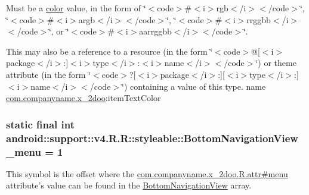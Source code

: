 Must be a \hyperlink{classandroid_1_1support_1_1v4_1_1_r_1_1color}{color} value, in the form of \char`\"{}$<$code$>$\#$<$i$>$rgb$<$/i$>$$<$/code$>$\char`\"{}, \char`\"{}$<$code$>$\#$<$i$>$argb$<$/i$>$$<$/code$>$\char`\"{}, \char`\"{}$<$code$>$\#$<$i$>$rrggbb$<$/i$>$$<$/code$>$\char`\"{}, or \char`\"{}$<$code$>$\#$<$i$>$aarrggbb$<$/i$>$$<$/code$>$\char`\"{}. 

This may also be a reference to a resource (in the form \char`\"{}$<$code$>$@\mbox{[}$<$i$>$package$<$/i$>$:\mbox{]}$<$i$>$type$<$/i$>$:$<$i$>$name$<$/i$>$$<$/code$>$\char`\"{}) or theme attribute (in the form \char`\"{}$<$code$>$?\mbox{[}$<$i$>$package$<$/i$>$:\mbox{]}\mbox{[}$<$i$>$type$<$/i$>$:\mbox{]}$<$i$>$name$<$/i$>$$<$/code$>$\char`\"{}) containing a value of this type.  name \hyperlink{namespacecom_1_1companyname_1_1x__2doo}{com.companyname.x\_\-2doo}:itemTextColor \hypertarget{classandroid_1_1support_1_1v4_1_1_r_1_1styleable_b466b14ca9f60097882bb309cd4e7d6f}{
\subsubsection[{BottomNavigationView\_\-menu}]{\setlength{\rightskip}{0pt plus 5cm}static final int android::support::v4.R.R::styleable::BottomNavigationView\_\-menu = 1}}
\label{classandroid_1_1support_1_1v4_1_1_r_1_1styleable_b466b14ca9f60097882bb309cd4e7d6f}


This symbol is the offset where the \hyperlink{classcom_1_1companyname_1_1x__2doo_1_1_r_1_1attr_fa221ba686f006e0a8bec2d75d7bcbe7}{com.companyname.x\_\-2doo.R.attr\#menu} attribute's value can be found in the \hyperlink{classandroid_1_1support_1_1v4_1_1_r_1_1styleable_731fa193e6e8634aff724fecf9d4f640}{BottomNavigationView} array.

